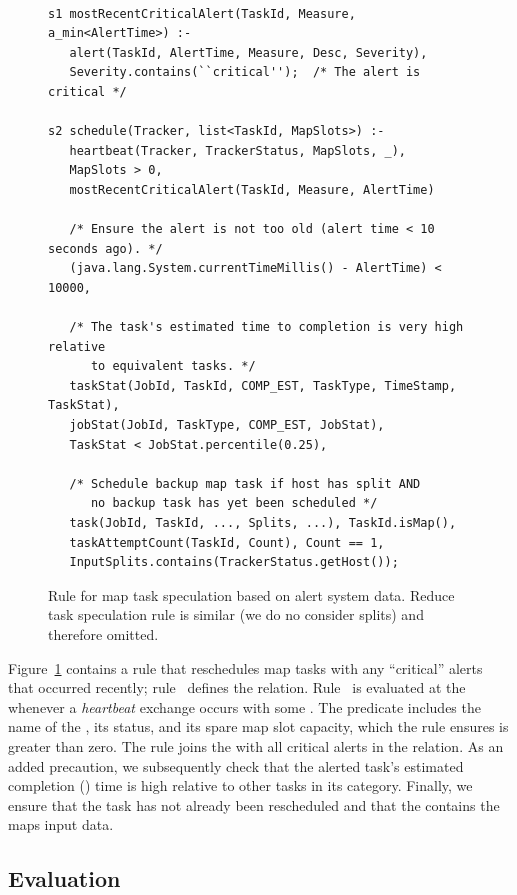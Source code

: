 \begin{figure}
\ssp
\centering
\begin{lstlisting}

s1 mostRecentCriticalAlert(TaskId, Measure, a_min<AlertTime>) :-
   alert(TaskId, AlertTime, Measure, Desc, Severity),
   Severity.contains(``critical'');  /* The alert is critical */

s2 schedule(Tracker, list<TaskId, MapSlots>) :-
   heartbeat(Tracker, TrackerStatus, MapSlots, _),
   MapSlots > 0,
   mostRecentCriticalAlert(TaskId, Measure, AlertTime)

   /* Ensure the alert is not too old (alert time < 10 seconds ago). */
   (java.lang.System.currentTimeMillis() - AlertTime) < 10000,

   /* The task's estimated time to completion is very high relative
      to equivalent tasks. */
   taskStat(JobId, TaskId, COMP_EST, TaskType, TimeStamp, TaskStat),
   jobStat(JobId, TaskType, COMP_EST, JobStat),
   TaskStat < JobStat.percentile(0.25),

   /* Schedule backup map task if host has split AND 
      no backup task has yet been scheduled */
   task(JobId, TaskId, ..., Splits, ...), TaskId.isMap(),
   taskAttemptCount(TaskId, Count), Count == 1,
   InputSplits.contains(TrackerStatus.getHost());
\end{lstlisting}
\caption{\label{ch:hop:fig:speculation} 
Rule for map task speculation based on alert system data. Reduce task 
speculation rule is similar (we do no consider splits) and therefore omitted. }
\end{figure}    
   
Figure~\ref{ch:hop:fig:speculation} contains a rule that reschedules map tasks
with any ``critical'' alerts that occurred recently; rule~ defines the
 relation.  Rule~ is evaluated at the \JT
whenever a {\em heartbeat} exchange occurs with some \TT.  The 
predicate includes the name of the \TT, its status, and its spare map slot
capacity, which the rule ensures is greater than zero.  The rule joins the
 with all critical alerts in the 
relation.  As an added precaution, we subsequently check that the alerted
task's estimated completion () time is high relative to other
tasks in its category.  Finally, we ensure that the task has not already been
rescheduled and that the \TT contains the maps input data.


\subsection{Evaluation}

